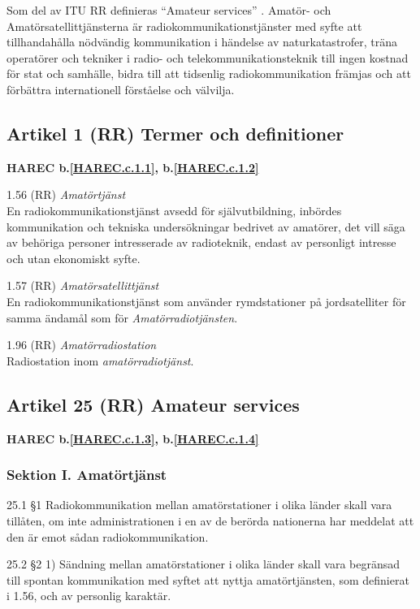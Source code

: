Som del av ITU RR definieras ``Amateur services'' \cite[Article 25]{ITU-RR}.
Amatör- och Amatörsatellittjänsterna är radiokommunikationstjänster
med syfte att tillhandahålla nödvändig kommunikation i händelse av
naturkatastrofer, träna operatörer och tekniker i radio- och
telekommunikationsteknik till ingen kostnad för stat och samhälle,
bidra till att tidsenlig radiokommunikation främjas och att förbättra
internationell förståelse och välvilja.

\subsection{Artikel 1 (RR) Termer och definitioner}
\textbf{
HAREC b.\ref{HAREC.c.1.1}\label{myHAREC.c.1.1},
 b.\ref{HAREC.c.1.2}\label{myHAREC.c.1.2}
}

1.56 (RR) \emph{Amatörtjänst} \cite[1.56]{ITU-RR}\\
En radiokommunikationstjänst avsedd för självutbildning, inbördes
kommunikation och tekniska undersökningar bedrivet av amatörer, det
vill säga av behöriga personer intresserade av radioteknik,
endast av personligt intresse och utan ekonomiskt syfte.

1.57 (RR) \emph{Amatörsatellittjänst} \cite[1.57]{ITU-RR}\\
En radiokommunikationstjänst som använder rymdstationer på
jordsatelliter för samma ändamål som för \emph{Amatörradiotjänsten}.

1.96 (RR) \emph{Amatörradiostation} \cite[1.96]{ITU-RR}\\
Radiostation inom \emph{amatörradiotjänst}.

\subsection{Artikel 25 (RR) Amateur services}
\textbf{
HAREC b.\ref{HAREC.c.1.3}\label{myHAREC.c.1.3},
 b.\ref{HAREC.c.1.4}\label{myHAREC.c.1.4}
}

\subsubsection{Sektion I. Amatörtjänst}
25.1 §1 Radiokommunikation mellan amatörstationer i olika länder
skall vara tillåten, om inte administrationen i en av de berörda
nationerna har meddelat att den är emot sådan radiokommunikation.
\cite[25.1]{ITU-RR}

25.2 §2 1) Sändning mellan amatörstationer i olika länder skall vara
begränsad till spontan kommunikation med syftet att nyttja amatörtjänsten,
som definierat i 1.56, och av personlig karaktär.
\cite[25.2]{ITU-RR}

